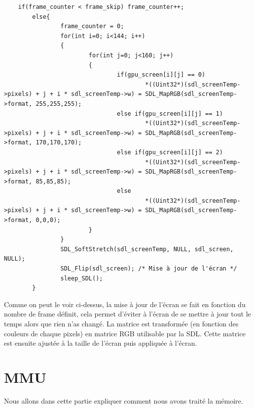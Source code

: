 \documentclass{report}
\begin{document}
\begin{lstlisting}
	if(frame_counter < frame_skip) frame_counter++;
        else{
                frame_counter = 0;
                for(int i=0; i<144; i++)
                {
                        for(int j=0; j<160; j++)
                        {
                                if(gpu_screen[i][j] == 0)
                                        *((Uint32*)(sdl_screenTemp->pixels) + j + i * sdl_screenTemp->w) = SDL_MapRGB(sdl_screenTemp->format, 255,255,255);
                                else if(gpu_screen[i][j] == 1)
                                        *((Uint32*)(sdl_screenTemp->pixels) + j + i * sdl_screenTemp->w) = SDL_MapRGB(sdl_screenTemp->format, 170,170,170);
                                else if(gpu_screen[i][j] == 2)
                                        *((Uint32*)(sdl_screenTemp->pixels) + j + i * sdl_screenTemp->w) = SDL_MapRGB(sdl_screenTemp->format, 85,85,85);
                                else
                                        *((Uint32*)(sdl_screenTemp->pixels) + j + i * sdl_screenTemp->w) = SDL_MapRGB(sdl_screenTemp->format, 0,0,0);
                        }
                }
                SDL_SoftStretch(sdl_screenTemp, NULL, sdl_screen, NULL);
                SDL_Flip(sdl_screen); /* Mise à jour de l'écran */
                sleep_SDL();
        }

\end{lstlisting}
Comme on peut le voir ci-dessus, la mise à jour de l'écran se fait en fonction du nombre de frame définit, cela permet d'éviter à l'écran de se mettre à jour tout le temps alors que rien n'as changé. La matrice est transformée (en fonction des couleurs de chaque pixels) en matrice RGB utilisable par la SDL. Cette matrice est ensuite ajustée à la taille de l'écran puis appliquée à l'écran.\\

\section{MMU}
Nous allons dans cette partie expliquer comment nous avons traité la mémoire. 
\end{document}
